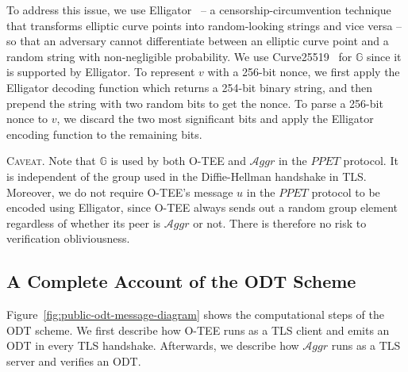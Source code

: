 \documentclass[letterpaper,twocolumn,10pt]{article}
\newcommand{\T}{\ensuremath{\mathcal{A}ggr}\xspace}
\newcommand{\GG}{\mathbb{G}}
\begin{document}
To address this issue, we use Elligator~\cite{bernsteinElligatorEllipticcurvePoints2013} -- a censorship-circumvention
technique that transforms elliptic curve points into random-looking strings and vice versa -- so that an adversary cannot
differentiate between an elliptic curve point and a random string with non-negligible probability.
We use Curve25519~\cite{bernsteinCurve25519NewDiffieHellman2006} for $\GG$ since it is supported by Elligator.
To represent $v$ with a 256-bit nonce, we first apply the Elligator decoding function which returns a 254-bit binary string,
and then prepend the string with two random bits to get the nonce. To parse a 256-bit nonce to $v$, we discard
the two most significant bits and apply the Elligator encoding function to the remaining bits.

\textsc{Caveat.} Note that $\GG$ is used by both O-TEE and \T in the $\mathit{PPET}$ protocol. It is independent
of the group used in the Diffie-Hellman handshake in TLS. Moreover, we do not require O-TEE's message $u$
in the $\mathit{PPET}$ protocol to be encoded using Elligator, since O-TEE always sends out a random group element
regardless of whether its peer is \T or not. There is therefore no risk to verification obliviousness.

\subsection{A Complete Account of the ODT Scheme}

Figure~\ref{fig:public-odt-message-diagram} shows the computational steps of the ODT scheme. We first describe how
O-TEE runs as a TLS client and emits an ODT in every TLS handshake. Afterwards, we describe how \T runs as
a TLS server and verifies an ODT.
\end{document}
